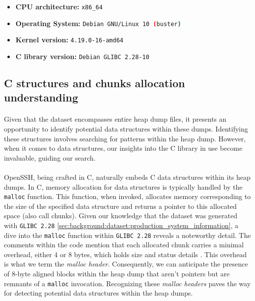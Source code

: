         \begin{itemize}
            \item \textbf{CPU architecture:} \lstinline[language=bash]|x86_64|
            \item \textbf{Operating System:} \lstinline[language=bash]|Debian GNU/Linux 10 (buster)|
            \item \textbf{Kernel version:} \lstinline[language=bash]|4.19.0-16-amd64|
            \item \textbf{C library version:} \lstinline[language=bash]|Debian GLIBC 2.28-10|
        \end{itemize}

    \subsection{C structures and chunks allocation understanding}

        \paragraph{}Given that the dataset encompasses entire heap dump files, it presents an opportunity to identify potential data structures within these dumps. Identifying these structures involves searching for patterns within the heap dump. However, when it comes to data structures, our insights into the C library in use become invaluable, guiding our search.

        \paragraph{}OpenSSH, being crafted in C, naturally embeds C data structures within its heap dumps. In C, memory allocation for data structures is typically handled by the \lstinline[language=c]|malloc| function. This function, when invoked, allocates memory corresponding to the size of the specified data structure and returns a pointer to this allocated space (also call chunks). Given our knowledge that the dataset was generated with \texttt{GLIBC 2.28} \ref{sec:background:dataset:production_system_information}, a dive into the \lstinline[language=c]|malloc| function within \texttt{GLIBC 2.28} reveals a noteworthy detail. The comments within the code mention that each allocated chunk carries a minimal overhead, either 4 or 8 bytes, which holds size and status details \cite{gloger_malloc_2001}. This overhead is what we term the \textit{malloc header}. Consequently, we can anticipate the presence of 8-byte aligned blocks within the heap dump that aren't pointers but are remnants of a \lstinline[language=c]|malloc| invocation. Recognizing these \textit{malloc headers} paves the way for detecting potential data structures within the heap dumps.


